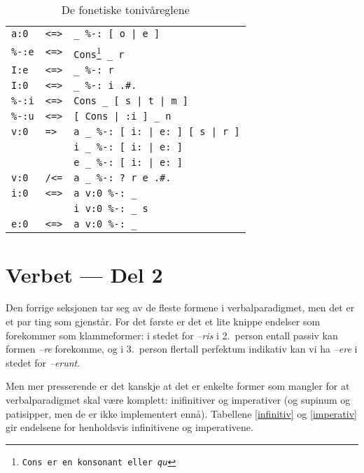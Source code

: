 \documentclass[a4paper]{article}
\begin{document}
\begin{savenotes}
\begin{table}[hp]
\begin{center}
\begin{tabular}{rcl}
\texttt{a:0  } & \texttt{<=>} & \texttt{\_ \%-: [ o | e ]} \\
\texttt{\%-:e} & \texttt{<=>} & \texttt{Cons\footnote{\texttt{Cons} er en konsonant eller \emph{qu} } \_ r} \\
\texttt{I:e  } & \texttt{<=>} & \texttt{\_ \%-: r} \\
\texttt{I:0  } & \texttt{<=>} & \texttt{\_ \%-: i .\#.} \\
\texttt{\%-:i} & \texttt{<=>} & \texttt{Cons \_ [ s | t | m ]} \\
\texttt{\%-:u} & \texttt{<=>} & \texttt{[ Cons | :i ] \_ n} \\
\texttt{v:0  } & \texttt{=> } & \texttt{a \_ \%-: [ i: | e: ] [ s | r ]} \\
\texttt{     } & \texttt{   } & \texttt{i \_ \%-: [ i: | e: ]} \\
\texttt{     } & \texttt{   } & \texttt{e \_ \%-: [ i: | e: ]} \\
\texttt{v:0  } & \texttt{/<=} & \texttt{a \_ \%-: ? r e .\#.} \\
\texttt{i:0  } & \texttt{<=>} & \texttt{a v:0 \%-: \_} \\
\texttt{     } & \texttt{   } & \texttt{i v:0 \%-: \_ s} \\
\texttt{e:0  } & \texttt{<=>} & \texttt{a v:0 \%-: \_} \\
\end{tabular}
\caption{De fonetiske toniv\aa{}reglene}
\label{twolc}
\end{center}
\end{table}
\end{savenotes}

\section{Verbet --- Del 2}
Den forrige seksjonen tar seg av de fleste formene i verbalparadigmet, men det
er et par ting som gjenst\aa{}r. For det f\o{}rste er det et lite knippe
endelser som forekommer som klammeformer: i stedet for \emph{--ris} i
2.~person entall passiv kan formen \emph{--re} forekomme, og i 3.~person
flertall perfektum indikativ kan vi ha \emph{--ere} i stedet for
\emph{--erunt}.

Men mer presserende er det kanskje at det er enkelte former som mangler for at
verbalparadigmet skal v\ae{}re komplett: inifinitiver og imperativer (og
supinum og patisipper, men de er ikke implementert enn\aa{}). Tabellene
\ref{infinitiv} og \ref{imperativ} gir endelsene for henholdsvis infinitivene
og imperativene.
\end{document}
